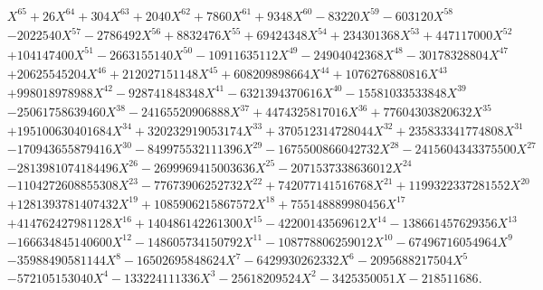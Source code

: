 \documentclass[12pt,oneside]{amsart}
\numberwithin{equation}{section}
\theoremstyle{definition}
\begin{document}
\begin{figure}
  \footnotesize
  \begin{align*}
    &X^{65} + 26X^{64} + 304X^{63} + 2040X^{62} + 7860X^{61} + 9348X^{60} - 83220X^{59}- 603120X^{58}\\ & - 2022540X^{57}
      - 2786492X^{56} + 8832476X^{55} + 69424348X^{54} + 234301368X^{53} + 447117000X^{52}\\ &  + 104147400X^{51}
      - 2663155140X^{50} - 10911635112X^{49} - 24904042368X^{48} - 30178328804X^{47}\\ &  + 20625545204X^{46}
      + 212027151148X^{45} + 608209898664X^{44} + 1076276880816X^{43} \\ &+ 998018978988X^{42} - 928741848348X^{41}
      - 6321394370616X^{40} - 15581033533848X^{39} \\ &- 25061758639460X^{38} - 24165520906888X^{37} + 4474325817016X^{36}
      + 77604303820632X^{35}\\ & + 195100630401684X^{34} + 320232919053174X^{33} + 370512314728044X^{32}
      + 235833341774808X^{31}\\ & - 170943655879416X^{30} - 849975532111396X^{29} - 1675500866042732X^{28}
      - 2415604343375500X^{27}\\ & - 2813981074184496X^{26} - 2699969415003636X^{25} - 2071537338636012X^{24}\\ &
      - 1104272608855308X^{23} - 77673906252732X^{22} + 742077141516768X^{21} + 1199322337281552X^{20}\\ &
      + 1281393781407432X^{19} + 1085906215867572X^{18} + 755148889980456X^{17}\\ & + 414762427981128X^{16}
      + 140486142261300X^{15} - 42200143569612X^{14} - 138661457629356X^{13}\\ & - 166634845140600X^{12} - 148605734150792X^{11}
      - 108778806259012X^{10} - 67496716054964X^9\\ & - 35988490581144X^8 - 16502695848624X^7 - 6429930262332X^6
      - 2095688217504X^5\\ & - 572105153040X^4 - 133224111336X^3 - 25618209524X^2 - 3425350051X - 218511686.
  \end{align*}
  \begin{align*}

\end{align*}
\end{figure}
\end{document}
